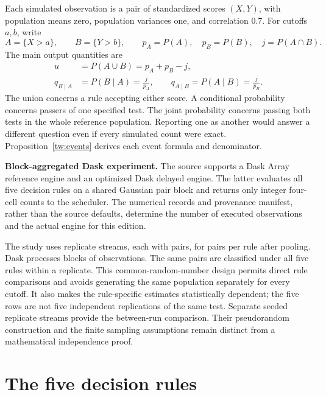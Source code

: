 Each simulated observation is a pair of standardized scores \((X,Y)\), with
population means zero, population variances one, and correlation \(0.7\).
For cutoffs \(a,b\), write
\[
 A=\{X>a\},\qquad B=\{Y>b\},\qquad
 p_A=P(A),\quad p_B=P(B),\quad j=P(A\cap B).
\]
The main output quantities are
\begin{align}
 u&=P(A\cup B)=p_A+p_B-j,\label{eq:towers-union}\\
 q_{B\mid A}&=P(B\mid A)=\frac{j}{p_A},\qquad
 q_{A\mid B}=P(A\mid B)=\frac{j}{p_B}.
 \label{eq:towers-conditionals}
\end{align}
The union concerns a rule accepting either score. A conditional probability
concerns passers of one specified test. The joint probability concerns passing
both tests in the whole reference population. Reporting one as another would
answer a different question even if every simulated count were exact.
Proposition~\ref{tw:events} derives each event formula and denominator.


\noindent\textbf{Block-aggregated Dask experiment.}
The source supports a Dask Array reference engine and an optimized
Dask delayed engine. The latter evaluates all five decision rules
on a shared Gaussian pair block and returns only integer four-cell
counts to the scheduler. The numerical records and provenance manifest,
rather than the source defaults, determine the number of executed
observations and the actual engine for this edition.

The study uses \SimReplicates{} replicate streams, each with
\SimTrials{} pairs, for \SimPooledTrials{} pairs per rule after pooling.
Dask processes blocks of \SimChunk{} observations. The same pairs are
classified under all five rules within a replicate. This common-random-number
design permits direct rule comparisons and avoids generating the same
population separately for every cutoff. It also makes the rule-specific
estimates statistically dependent; the five rows are not five independent
replications of the same test. Separate seeded replicate streams provide the
between-run comparison. Their pseudorandom construction and the finite
sampling assumptions remain distinct from a mathematical independence proof.

\section{The five decision rules}

